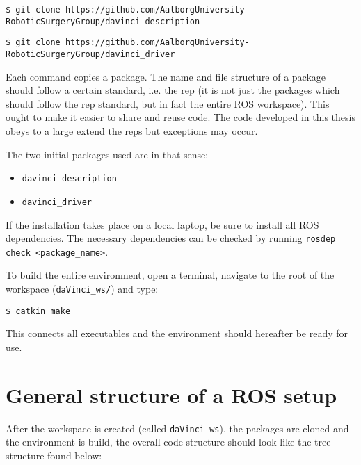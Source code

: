 \hspace{0cm} \texttt{\$ git clone https://github.com/AalborgUniversity-RoboticSurgeryGroup/davinci\_description}

\hspace{0cm} \texttt{\$ git clone https://github.com/AalborgUniversity-RoboticSurgeryGroup/davinci\_driver}


Each command copies a package. The name and file structure of a package should follow a certain standard, i.e. the \gls{rep} (it is not just the packages which should follow the \gls{rep} standard, but in fact the entire ROS workspace). This ought to make it easier to share and reuse code. The code developed in this thesis obeys to a large extend the \gls{rep}s but exceptions may occur. 

The two initial packages used are in that sense:
\begin{itemize}
\item \texttt{davinci\_description}
\item \texttt{davinci\_driver}
\end{itemize}
If the installation takes place on a local laptop, be sure to install all ROS dependencies. The necessary dependencies can be checked by running \texttt{rosdep check <package\_name>}.

To build the entire environment, open a terminal, navigate to the root of the workspace (\texttt{daVinci\_ws/}) and type:

\hspace{1cm} \texttt{\$ catkin\_make}

This connects all executables and the environment should hereafter be ready for use.
\section{General structure of a ROS setup}
After the workspace is created (called \texttt{daVinci\_ws}), the packages are cloned and the environment is build, the overall code structure should look like the tree structure found below:

\vspace{0.5cm}

